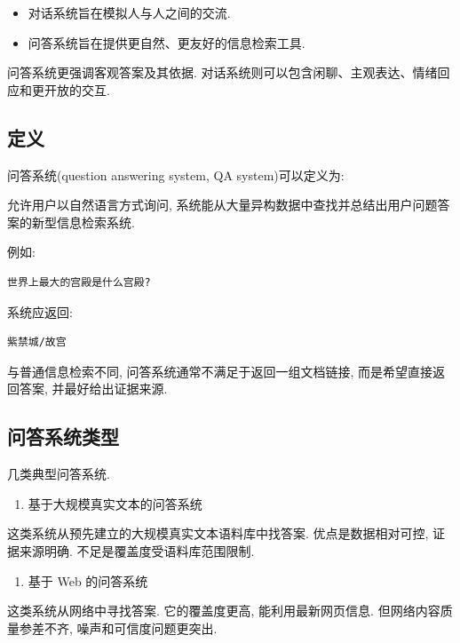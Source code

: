 \begin{itemize}
\item 对话系统旨在模拟人与人之间的交流.
\item 问答系统旨在提供更自然、更友好的信息检索工具.
\end{itemize}

问答系统更强调客观答案及其依据.
对话系统则可以包含闲聊、主观表达、情绪回应和更开放的交互.

\subsection{定义}


问答系统(question answering system, QA system)可以定义为:

允许用户以自然语言方式询问,
系统能从大量异构数据中查找并总结出用户问题答案的新型信息检索系统.

例如:

\begin{Verbatim}[breaklines=true,breakanywhere=true,fontsize=\small]
世界上最大的宫殿是什么宫殿?
\end{Verbatim}

系统应返回:

\begin{Verbatim}[breaklines=true,breakanywhere=true,fontsize=\small]
紫禁城/故宫
\end{Verbatim}

与普通信息检索不同, 问答系统通常不满足于返回一组文档链接,
而是希望直接返回答案, 并最好给出证据来源.

\subsection{问答系统类型}


几类典型问答系统.

\begin{enumerate}
\item[1.] 基于大规模真实文本的问答系统
\end{enumerate}

这类系统从预先建立的大规模真实文本语料库中找答案.
优点是数据相对可控, 证据来源明确.
不足是覆盖度受语料库范围限制.

\begin{enumerate}
\item[2.] 基于 Web 的问答系统
\end{enumerate}

这类系统从网络中寻找答案.
它的覆盖度更高, 能利用最新网页信息.
但网络内容质量参差不齐, 噪声和可信度问题更突出.

